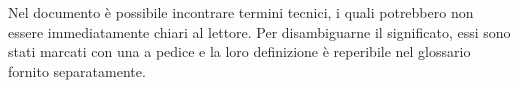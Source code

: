 Nel documento è possibile incontrare termini tecnici, i quali potrebbero non essere immediatamente chiari al lettore. Per disambiguarne il significato, essi sono stati marcati con una  a pedice e la loro definizione è reperibile nel glossario fornito separatamente.